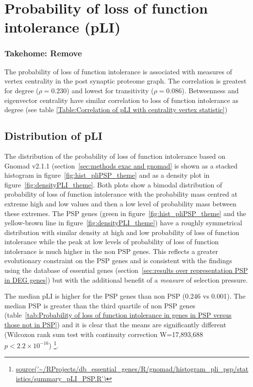 \clearpage
\section{Probability of loss of function intolerance (pLI)}
\label{sec: results pLI}
 \subsubsection{Takehome: Remove}

The probability of loss of function intolerance is associated with measures of vertex centrality in the post synaptic proteome graph. The correlation is greatest for degree ($\rho=0.230$) and lowest for transitivity ($\rho=0.086$). Betweenness and eigenvector centrality have similar correlation to loss of function intolerance as degree (see table \ref{Table:Correlation of pLI with centrality vertex statistic})

\subsection{Distribution of pLI}
\label{sec:results distribution of pli}
The distribution of the probability of loss of function intolerance based on Gnomad v2.1.1 (section~\ref{sec:methods exac and gnomad} is shown as a stacked histogram in  figure~\ref{fig:hist_pliPSP_theme} and as a density plot in figure~\ref{fig:densityPLI_theme}. Both plots show a bimodal distribution of probability of loss of function intolerance with the probability mass centred at extreme high and low values and then a low level of probability mass between these extremes. The PSP genes (green in figure~\ref{fig:hist_pliPSP_theme} and the yellow-brown line in figure~\ref{fig:densityPLI_theme}) have a roughly symmetrical distribution with similar density at high and low probability of loss of function intolerance while the peak at low levels of probability of loss of function intolerance is much higher in the non PSP genes. This reflects a greater evolutionary constraint on the PSP genes and is consistent with the findings using the database of essential genes (section~\ref{sec:results over representation PSP in DEG genes}) but with the additional benefit of a \textit{measure} of selection pressure. 


The median pLI is higher for the PSP genes than non PSP (0.246 vs 0.001). The median PSP is greater than the third quartile of non PSP genes (table~\ref{tab:Probability of loss of function intolerance in genes in PSP versus those not in PSP}) and it is clear that the means are significantly different (Wilcoxon rank sum test with continuity correction W=17,893,688 $p<2.2\times10^{-16}$) \footnote{\url{source('~/RProjects/db_essential_genes/R/gnomad/histogram_pli_psp/statistics/summary_pLI_PSP.R')}}.


